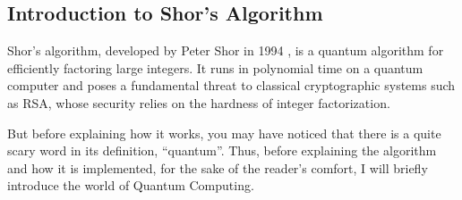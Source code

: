 \subsection{Introduction to Shor's Algorithm}

Shor's algorithm, developed by Peter Shor in 1994 \cite{shor1994}, is a
quantum algorithm for efficiently factoring large integers. It runs in
polynomial time on a quantum computer and poses a fundamental threat to
classical cryptographic systems such as RSA, whose security relies on the
hardness of integer factorization.

But before explaining how it works, you may have noticed that there is a quite
scary word in its definition, ``quantum''. Thus, before explaining the
algorithm and how it is implemented, for the sake of the reader's comfort,
I will briefly introduce the world of Quantum Computing.